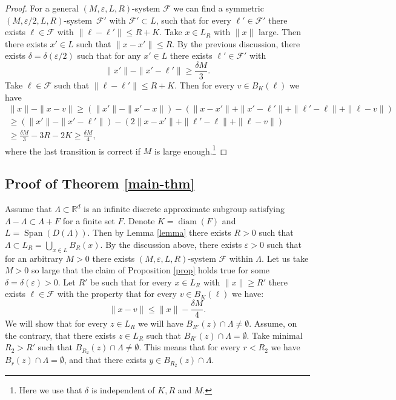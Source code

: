 \documentclass[10pt]{amsart}
\DeclareMathOperator{\diam}{diam}
\DeclareMathOperator{\Span}{Span}
\newcommand{\cF}{\mathcal{F}}
\newcommand{\bR}{\mathbb{R}}
\let\eps\varepsilon
\theoremstyle{plain}
\theoremstyle{definition}
\begin{document}
\begin{proof}
For a general $(M,\eps,L,R)$-system $\cF$ we can find a symmetric $(M,\eps/2,L,R)$-sys\-tem~$\cF'$ with $\cF' \subset L$, such that for every $\ell' \in \cF'$ there exists $\ell \in \cF$ with $\| \ell - \ell' \| \le R+K$. Take $x \in L_R$ with $\| x \|$ large. Then there exists $x' \in L$ such that $\|x - x'\| \le R$. By the previous discussion, there exists $\delta = \delta(\eps/2)$ such that for any $x' \in L$ there exists $\ell' \in \cF'$ with
\[
\| x' \| - \| x' - \ell'\| \ge \frac{\delta M}{3}.
\]
Take $\ell \in \cF$ such that $\|\ell - \ell' \| \le R+K$. Then for every $v \in B_K(\ell)$ we have
\begin{multline*}
\|x\| - \| x - v\| \ge (\|x' \| - \| x' - x \|) - \left( \| x - x' \| + \| x' - \ell'\| + \| \ell' - \ell \| + \| \ell - v \| \right)\\
\ge \left( \| x' \| - \| x' - \ell' \| \right) - (2 \| x - x' \| + \| \ell' - \ell \| + \| \ell - v \|)\\
\ge \frac{\delta M}{3} - 3R - 2K \ge \frac{\delta M}{4},
\end{multline*}
where the last transition is correct if $M$ is large enough.\footnote{Here we use that $\delta$ is independent of $K,R$ and $M$.}
\end{proof}

\subsection{Proof of Theorem \ref{main-thm}}
Assume that $\Lambda \subset \bR^d$ is an infinite discrete approximate subgroup satisfying $\Lambda - \Lambda \subset \Lambda + F$ for a finite set $F$. Denote $K =\diam(F)$ and $L = \Span(D(\Lambda))$. Then by Lemma \ref{lemma} there exists $R > 0$ such that $\Lambda \subset L_R = \bigcup_{x \in L} B_R(x)$. By the discussion above, there exists $\eps> 0$ such that for an arbitrary $M > 0$ there exists $(M,\eps,L,R)$-system $\cF$ within $\Lambda$.
Let us take $M > 0$ so large that the claim of Proposition \ref{prop} holds true for some $\delta = \delta(\eps) > 0$. Let $R'$ be such that
for every $x \in L_R$ with $\| x \| \ge R'$ there exists $\ell \in \cF$ with the property that for every $v \in B_{K}(\ell)$ we have:
\[
\|x - v\| \le \| x \| - \frac{\delta M}{4}.
\]
We will show that for every $z \in L_R$ we will have $B_{R'}(z) \cap \Lambda \neq \emptyset$. Assume, on the contrary, that there exists $z \in L_R$ such that $B_{R'}(z) \cap \Lambda = \emptyset$. Take minimal $R_2 > R'$ such that $B_{R_2}(z) \cap \Lambda \neq \emptyset$. This means that for every $r < R_2$ we have $B_{r}(z) \cap \Lambda = \emptyset$, and that there exists $y \in B_{R_2}(z) \cap \Lambda$.
\end{document}
